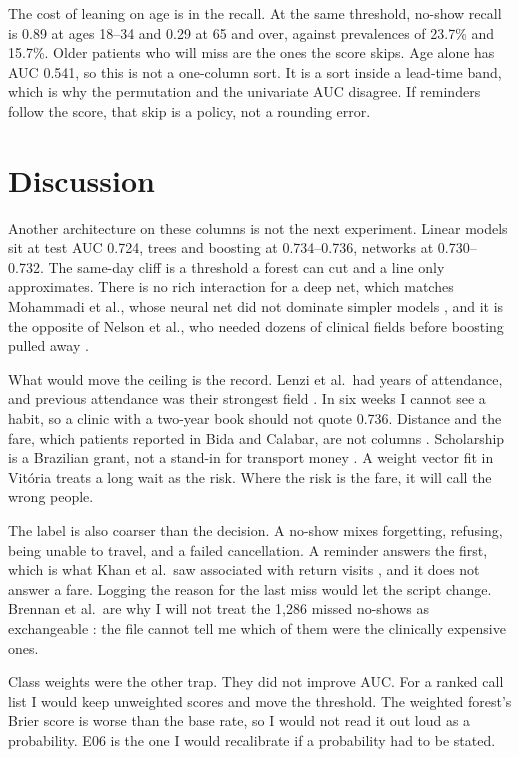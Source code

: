 \documentclass[conference]{IEEEtran}
\begin{document}
The cost of leaning on age is in the recall. At the same threshold, no-show recall is 0.89 at ages 18--34 and 0.29 at 65 and over, against prevalences of 23.7\% and 15.7\%. Older patients who will miss are the ones the score skips. Age alone has AUC 0.541, so this is not a one-column sort. It is a sort inside a lead-time band, which is why the permutation and the univariate AUC disagree. If reminders follow the score, that skip is a policy, not a rounding error.

\section{Discussion}
\label{sec:disc}
Another architecture on these columns is not the next experiment. Linear models sit at test AUC 0.724, trees and boosting at 0.734--0.736, networks at 0.730--0.732. The same-day cliff is a threshold a forest can cut and a line only approximates. There is no rich interaction for a deep net, which matches Mohammadi et al., whose neural net did not dominate simpler models \cite{mohammadi2018}, and it is the opposite of Nelson et al., who needed dozens of clinical fields before boosting pulled away \cite{nelson2019}.

What would move the ceiling is the record. Lenzi et al.\ had years of attendance, and previous attendance was their strongest field \cite{lenzi2019}. In six weeks I cannot see a habit, so a clinic with a two-year book should not quote 0.736. Distance and the fare, which patients reported in Bida and Calabar, are not columns \cite{omokanye2021,edet2024}. Scholarship is a Brazilian grant, not a stand-in for transport money \cite{dantas2018}. A weight vector fit in Vit\'{o}ria treats a long wait as the risk. Where the risk is the fare, it will call the wrong people.

The label is also coarser than the decision. A no-show mixes forgetting, refusing, being unable to travel, and a failed cancellation. A reminder answers the first, which is what Khan et al.\ saw associated with return visits \cite{khan2023}, and it does not answer a fare. Logging the reason for the last miss would let the script change. Brennan et al.\ are why I will not treat the 1,286 missed no-shows as exchangeable \cite{brennan2010}: the file cannot tell me which of them were the clinically expensive ones.

Class weights were the other trap. They did not improve AUC. For a ranked call list I would keep unweighted scores and move the threshold. The weighted forest's Brier score is worse than the base rate, so I would not read it out loud as a probability. E06 is the one I would recalibrate if a probability had to be stated.
\end{document}
